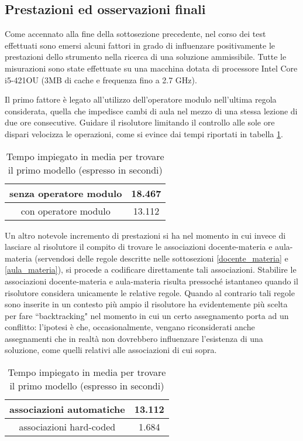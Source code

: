 \subsection{Prestazioni ed osservazioni finali}

Come accennato alla fine della sottosezione precedente, nel corso dei test effettuati sono emersi alcuni fattori in grado di influenzare positivamente le prestazioni dello strumento nella ricerca di una soluzione ammissibile.
Tutte le misurazioni sono state effettuate su una macchina dotata di processore Intel Core i5-421OU (3MB di cache e frequenza fino a 2.7 GHz).

Il primo fattore è legato all'utilizzo dell'operatore modulo nell'ultima regola considerata, quella che impedisce cambi di aula nel mezzo di una stessa lezione di due ore consecutive. Guidare il risolutore limitando il controllo alle sole ore dispari velocizza le operazioni, come si evince dai tempi riportati in tabella \ref{time1_table}.

\begin{table}[h]
\begin{center}
\begin{tabular}{ |c|c| } 
 \hline
 senza operatore modulo & 18.467  \\ 
 \hline
 con operatore modulo & 13.112  \\ 
 \hline
\end{tabular}
\caption{Tempo impiegato in media per trovare il primo modello (espresso in secondi)}
 \label{time1_table}
\end{center}
 \end{table}
 
Un altro notevole incremento di prestazioni si ha nel momento in cui invece di lasciare al risolutore il compito di trovare le associazioni docente-materia e aula-materia (servendosi delle regole descritte nelle sottosezioni \ref{docente_materia} e \ref{aula_materia}), si procede a codificare direttamente tali associazioni. Stabilire le associazioni docente-materia e aula-materia risulta pressoché istantaneo quando il risolutore considera unicamente le relative regole. Quando al contrario tali regole sono inserite in un contesto più ampio il risolutore ha evidentemente più scelta per fare ``backtracking" nel momento in cui un certo assegnamento porta ad un conflitto:  l'ipotesi è che, occasionalmente, vengano riconsiderati anche assegnamenti che in realtà non dovrebbero influenzare l'esistenza di una soluzione, come quelli relativi alle associazioni di cui sopra.
\begin{table}[h]
\begin{center}
\begin{tabular}{ |c|c| } 
 \hline
 associazioni automatiche & 13.112  \\ 
 \hline
 associazioni hard-coded & 1.684  \\ 
 \hline
\end{tabular}
\caption{Tempo impiegato in media per trovare il primo modello (espresso in secondi)}
\end{center}
 \end{table}

